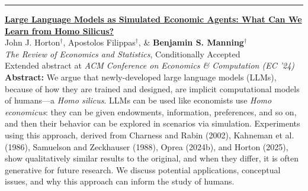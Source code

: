\documentclass[11pt]{article}
\newenvironment{publist}
  {\begin{list}{}{%
    \setlength{\leftmargin}{1.5em}%
    \setlength{\itemindent}{-1.5em}%
    \setlength{\itemsep}{10pt}%
    \setlength{\parsep}{0pt}%
    \setlength{\topsep}{4pt}}}
  {\end{list}}
\newcommand{\pubsection}[1]{\Needspace*{6\baselineskip}\vspace{6pt}{\large\scshape #1}\par\vspace{-4pt}\rule{\textwidth}{0.4pt}}
\begin{document}
\pubsection{Peer-Reviewed Publications}
\begin{publist}
\item \href{https://benjaminmanning.com/files/homo_silicus.pdf}{\textbf{Large Language Models as Simulated Economic Agents: What Can We Learn from Homo Silicus?}}\\
John J. Horton$^\dagger$, Apostolos Filippas$^\dagger$, \& \textbf{Benjamin S. Manning}$^\dagger$\\
\textit{The Review of Economics and Statistics}, Conditionally Accepted\\
Extended abstract at \textit{ACM Conference on Economics \& Computation (EC '24)}\\[3pt]
{\footnotesize \textbf{Abstract: }We argue that newly-developed large language models (LLMs), because of how they are trained and designed, are implicit computational models of humans---a \emph{Homo silicus}.
LLMs can be used like economists use \emph{Homo economicus}: they can be given endowments, information, preferences, and so on, and then their behavior can be explored in scenarios via simulation.
Experiments using this approach, derived from Charness and Rabin (2002), Kahneman et al. (1986), Samuelson and Zeckhauser (1988), Oprea (2024b), and Horton (2025), show qualitatively similar results to the original, and when they differ, it is often generative for future research.
We discuss potential applications, conceptual issues, and why this approach can inform the study of humans.}


\end{publist}
\end{document}
